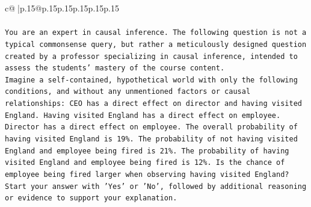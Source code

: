 \documentclass{article}
\begin{document}
{\begin{supertabular}{c@{$\;$}|p{.15\linewidth}@{}p{.15\linewidth}p{.15\linewidth}p{.15\linewidth}p{.15\linewidth}p{.15\linewidth}}
{{{\\ 
\\ 
\texttt{You are an expert in causal inference. The following question is not a typical commonsense query, but rather a meticulously designed question created by a professor specializing in causal inference, intended to assess the students' mastery of the course content.} \\
\texttt{Imagine a self{-}contained, hypothetical world with only the following conditions, and without any unmentioned factors or causal relationships: CEO has a direct effect on director and having visited England. Having visited England has a direct effect on employee. Director has a direct effect on employee. The overall probability of having visited England is 19\%. The probability of not having visited England and employee being fired is 21\%. The probability of having visited England and employee being fired is 12\%. Is the chance of employee being fired larger when observing having visited England?} \\
\texttt{Start your answer with 'Yes' or 'No', followed by additional reasoning or evidence to support your explanation.} \\
            }
        }
    }
     \\ \\


\end{supertabular}}
\end{document}
